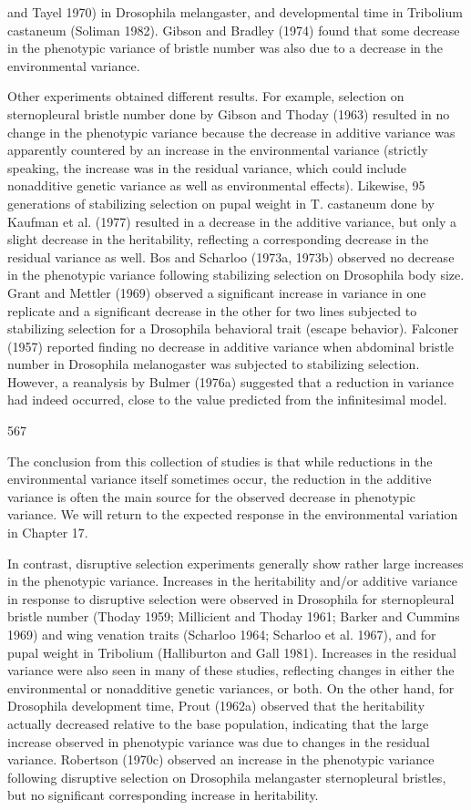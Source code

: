 \documentclass{article}
\begin{document}
and Tayel 1970) in Drosophila melangaster, and developmental time in Tribolium castaneum (Soliman 1982). Gibson and Bradley (1974) found that some decrease in the phenotypic variance of bristle number was also due to a decrease in the environmental variance.

Other experiments obtained different results. For example, selection on sternopleural bristle number done by Gibson and Thoday (1963) resulted in no change in the phenotypic variance because the decrease in additive variance was apparently countered by an increase in the environmental variance (strictly speaking, the increase was in the residual variance, which could include nonadditive genetic variance as well as environmental effects). Likewise, 95 generations of stabilizing selection on pupal weight in T. castaneum done by Kaufman et al. (1977) resulted in a decrease in the additive variance, but only a slight decrease in the heritability, reflecting a corresponding decrease in the residual variance as well. Bos and Scharloo (1973a, 1973b) observed no decrease in the phenotypic variance following stabilizing selection on Drosophila body size. Grant and Mettler (1969) observed a significant increase in variance in one replicate and a significant decrease in the other for two lines subjected to stabilizing selection for a Drosophila behavioral trait (escape behavior). Falconer (1957) reported finding no decrease in additive variance when abdominal bristle number in Drosophila melanogaster was subjected to stabilizing selection. However, a reanalysis by Bulmer (1976a) suggested that a reduction in variance had indeed occurred, close to the value predicted from the infinitesimal model.

567

The conclusion from this collection of studies is that while reductions in the environmental variance itself sometimes occur, the reduction in the additive variance is often the main source for the observed decrease in phenotypic variance. We will return to the expected response in the environmental variation in Chapter 17.

In contrast, disruptive selection experiments generally show rather large increases in the phenotypic variance. Increases in the heritability and/or additive variance in response to disruptive selection were observed in Drosophila for sternopleural bristle number (Thoday 1959; Millicient and Thoday 1961; Barker and Cummins 1969) and wing venation traits (Scharloo 1964; Scharloo et al. 1967), and for pupal weight in Tribolium (Halliburton and Gall 1981). Increases in the residual variance were also seen in many of these studies, reflecting changes in either the environmental or nonadditive genetic variances, or both. On the other hand, for Drosophila development time, Prout (1962a) observed that the heritability actually decreased relative to the base population, indicating that the large increase observed in phenotypic variance was due to changes in the residual variance. Robertson (1970c) observed an increase in the phenotypic variance following disruptive selection on Drosophila melangaster sternopleural bristles, but no significant corresponding increase in heritability.
\end{document}

